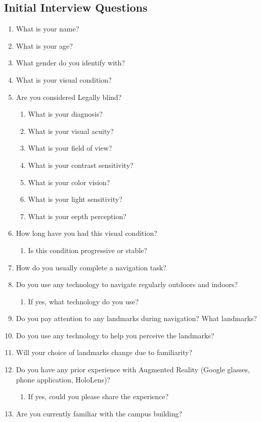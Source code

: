 \subsection{Initial Interview Questions}
\begin{enumerate}
    \item What is your name?
    \item What is your age?
    \item What gender do you identify with?
    \item What is your visual condition?
    \item Are you considered Legally blind?
\begin{enumerate}
    \item What is your diagnosis? 
    \item What is your visual acuity?
    \item What is your field of view?
    \item What is your contrast sensitivity?
    \item What is your color vision?
    \item What is your light sensitivity? 
    \item What is your eepth perception? 
\end{enumerate}
    \item How long have you had this visual condition?
\begin{enumerate}
    \item Is this condition progressive or stable?
\end{enumerate}
    \item How do you usually complete a navigation task?
    \item Do you use any technology to navigate regularly outdoors and indoors?
\begin{enumerate}
    \item If yes, what technology do you use?
\end{enumerate}
    \item Do you pay attention to any landmarks during navigation? What landmarks?
    \item Do you use any technology to help you perceive the landmarks?
    \item Will your choice of landmarks change due to familiarity?
    \item Do you have any prior experience with Augmented Reality (Google glasses, phone application, HoloLens)? 
\begin{enumerate}
    \item If yes, could you please share the experience?
\end{enumerate}
    \item Are you currently familiar with the campus building?
\end{enumerate}

